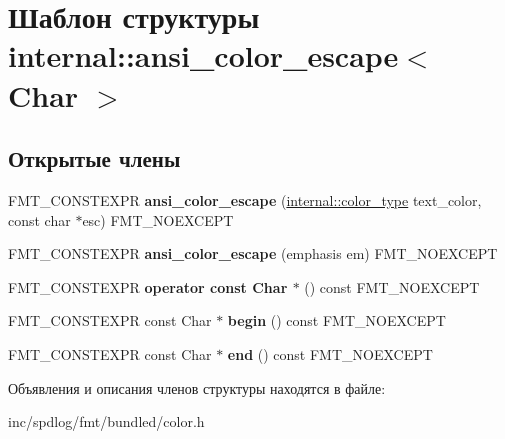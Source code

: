 \hypertarget{structinternal_1_1ansi__color__escape}{}\section{Шаблон структуры internal\+:\+:ansi\+\_\+color\+\_\+escape$<$ Char $>$}
\label{structinternal_1_1ansi__color__escape}
\subsection*{Открытые члены}
\begin{DoxyCompactItemize}
\item 
\mbox{\label{structinternal_1_1ansi__color__escape_ae3bd35bc9fb7e4f6bcf14b01d863d608}} 
F\+M\+T\+\_\+\+C\+O\+N\+S\+T\+E\+X\+PR {\bfseries ansi\+\_\+color\+\_\+escape} (\hyperlink{structinternal_1_1color__type}{internal\+::color\+\_\+type} text\+\_\+color, const char $\ast$esc) F\+M\+T\+\_\+\+N\+O\+E\+X\+C\+E\+PT
\item 
\mbox{\label{structinternal_1_1ansi__color__escape_a3e6165e4bdf4e0b65fcba754c6fb4c49}} 
F\+M\+T\+\_\+\+C\+O\+N\+S\+T\+E\+X\+PR {\bfseries ansi\+\_\+color\+\_\+escape} (emphasis em) F\+M\+T\+\_\+\+N\+O\+E\+X\+C\+E\+PT
\item 
\mbox{\label{structinternal_1_1ansi__color__escape_a7e81490080d70a2b39b9168d160a02b0}} 
F\+M\+T\+\_\+\+C\+O\+N\+S\+T\+E\+X\+PR {\bfseries operator const Char $\ast$} () const F\+M\+T\+\_\+\+N\+O\+E\+X\+C\+E\+PT
\item 
\mbox{\label{structinternal_1_1ansi__color__escape_a5e6928fdadcfaf6b665bb6ea75c4c777}} 
F\+M\+T\+\_\+\+C\+O\+N\+S\+T\+E\+X\+PR const Char $\ast$ {\bfseries begin} () const F\+M\+T\+\_\+\+N\+O\+E\+X\+C\+E\+PT
\item 
\mbox{\label{structinternal_1_1ansi__color__escape_af18c20904063d248fc28bcda0c02abe9}} 
F\+M\+T\+\_\+\+C\+O\+N\+S\+T\+E\+X\+PR const Char $\ast$ {\bfseries end} () const F\+M\+T\+\_\+\+N\+O\+E\+X\+C\+E\+PT
\end{DoxyCompactItemize}


Объявления и описания членов структуры находятся в файле\+:\begin{DoxyCompactItemize}
\item 
inc/spdlog/fmt/bundled/color.\+h\end{DoxyCompactItemize}
